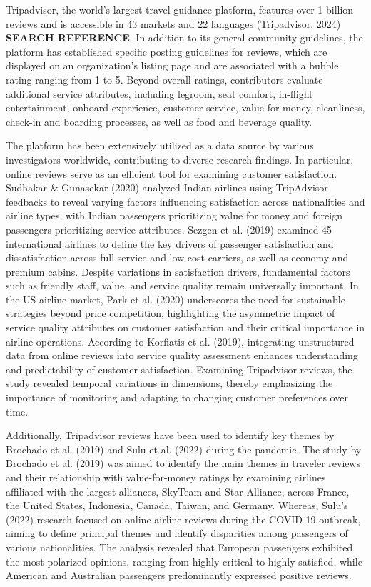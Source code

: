 \documentclass[
]{agujournal2019}
\begin{document}
Tripadvisor, the world's largest travel guidance platform, features over
1 billion reviews and is accessible in 43 markets and 22 languages
(Tripadvisor, 2024) \textbf{SEARCH REFERENCE}. In addition to its
general community guidelines, the platform has established specific
posting guidelines for reviews, which are displayed on an organization's
listing page and are associated with a bubble rating ranging from 1 to
5. Beyond overall ratings, contributors evaluate additional service
attributes, including legroom, seat comfort, in-flight entertainment,
onboard experience, customer service, value for money, cleanliness,
check-in and boarding processes, as well as food and beverage quality.

The platform has been extensively utilized as a data source by various
investigators worldwide, contributing to diverse research findings. In
particular, online reviews serve as an efficient tool for examining
customer satisfaction. Sudhakar \& Gunasekar (2020) analyzed Indian
airlines using TripAdvisor feedbacks to reveal varying factors
influencing satisfaction across nationalities and airline types, with
Indian passengers prioritizing value for money and foreign passengers
prioritizing service attributes. Sezgen et al. (2019) examined 45
international airlines to define the key drivers of passenger
satisfaction and dissatisfaction across full-service and low-cost
carriers, as well as economy and premium cabins. Despite variations in
satisfaction drivers, fundamental factors such as friendly staff, value,
and service quality remain universally important. In the US airline
market, Park et al. (2020) underscores the need for sustainable
strategies beyond price competition, highlighting the asymmetric impact
of service quality attributes on customer satisfaction and their
critical importance in airline operations. According to Korfiatis et al.
(2019), integrating unstructured data from online reviews into service
quality assessment enhances understanding and predictability of customer
satisfaction. Examining Tripadvisor reviews, the study revealed temporal
variations in dimensions, thereby emphasizing the importance of
monitoring and adapting to changing customer preferences over time.

Additionally, Tripadvisor reviews have been used to identify key themes
by Brochado et al. (2019) and Sulu et al. (2022) during the pandemic.
The study by Brochado et al. (2019) was aimed to identify the main
themes in traveler reviews and their relationship with value-for-money
ratings by examining airlines affiliated with the largest alliances,
SkyTeam and Star Alliance, across France, the United States, Indonesia,
Canada, Taiwan, and Germany. Whereas, Sulu's (2022) research focused on
online airline reviews during the COVID-19 outbreak, aiming to define
principal themes and identify disparities among passengers of various
nationalities. The analysis revealed that European passengers exhibited
the most polarized opinions, ranging from highly critical to highly
satisfied, while American and Australian passengers predominantly
expressed positive reviews.
\end{document}
